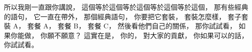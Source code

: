 \hypertarget{w02:cue:2826}{}所以我剛一直跟你講說，
\hypertarget{w02:cue:2827}{}這個等於這個等於這個等於這個等於這個，
\hypertarget{w02:cue:2828}{}那有些經典的語句，
\hypertarget{w02:cue:2829}{}它一直在帶外，
\hypertarget{w02:cue:2830}{}那個經典語句，
\hypertarget{w02:cue:2831}{}你要把它套裝，
\hypertarget{w02:cue:2832}{}套裝怎麼樣，
\hypertarget{w02:cue:2833}{}套子套裝 A，
\hypertarget{w02:cue:2834}{}套餐 A，
\hypertarget{w02:cue:2835}{}套餐 B，
\hypertarget{w02:cue:2836}{}套餐 C，
\hypertarget{w02:cue:2837}{}然後看他們自己的關係，
\hypertarget{w02:cue:2838}{}那你試試看，
\hypertarget{w02:cue:2839}{}如果你能做，
\hypertarget{w02:cue:2840}{}你願不願意？
\hypertarget{w02:cue:2841}{}這實在是，
\hypertarget{w02:cue:2842}{}你的，
\hypertarget{w02:cue:2843}{}對大家的貢獻，
\hypertarget{w02:cue:2844}{}你如果可以的話，
\hypertarget{w02:cue:2845}{}你試試看。


